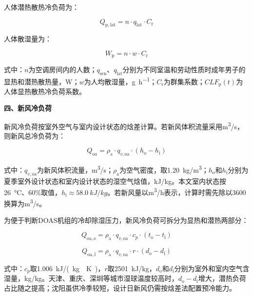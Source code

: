 人体潜热散热冷负荷为：

\begin{equation}
Q_{\mathrm{p,lat}}=n\cdot q_{\mathrm{lat}}\cdot C_{\mathrm{r}}
\label{eq:p-lat}
\end{equation}

人体散湿量为：

\begin{equation}
W_{\mathrm{p}}=n\cdot w\cdot C_{\mathrm{r}}
\label{eq:wet}
\end{equation}

式中：$n$为空调房间内的人数；$q_{\mathrm{sen}}$、$q_{\mathrm{lat}}$分别为不同室温和劳动性质时成年男子的显热和潜热散热量，\si{W}；$w$为人均散湿量，\si{g\per\hour}；$C_{\mathrm{r}}$为群集系数；$CLF_{\mathrm{p}}(t)$为人体显热散热冷负荷系数。

\textbf{四、新风冷负荷}

新风冷负荷按室外空气与室内设计状态的焓差计算。若新风体积流量采用\si{m^3/s}，则新风总冷负荷为：

\begin{equation}
Q_{\mathrm{oa}}=\rho_{\mathrm{a}}\cdot q_{v,\mathrm{oa}}\cdot(h_{\mathrm{o}}-h_{\mathrm{i}})
\label{eq:oa}
\end{equation}

式中：$q_{v,\mathrm{oa}}$为新风体积流量，\si{m^3/s}；$\rho_{\mathrm{a}}$为空气密度，取\SI{1.20}{kg/m^3}；$h_{\mathrm{o}}$和$h_{\mathrm{i}}$分别为夏季室外设计状态和室内设计状态的湿空气焓值，\si{kJ/kg}。本文室内状态按\SI{26}{\degreeCelsius}、60\%取值，$h_{\mathrm{i}}\approx\SI{58.0}{kJ/kg}$。若新风量以\si{m^3/h}表示，计算时需先除以3600换算为\si{m^3/s}。

为便于判断DOAS机组的冷却除湿压力，新风冷负荷可拆分为显热和潜热两部分：

\begin{equation}
Q_{\mathrm{oa,s}}=\rho_{\mathrm{a}}\cdot q_{v,\mathrm{oa}}\cdot c_p\cdot(t_{\mathrm{o}}-t_{\mathrm{i}})
\label{eq:oa-sensible}
\end{equation}

\begin{equation}
Q_{\mathrm{oa,l}}=\rho_{\mathrm{a}}\cdot q_{v,\mathrm{oa}}\cdot r\cdot(d_{\mathrm{o}}-d_{\mathrm{i}})
\label{eq:oa-latent}
\end{equation}

式中：$c_p$取\SI{1.006}{kJ/(kg\cdot K)}，$r$取\SI{2501}{kJ/kg}，$d_{\mathrm{o}}$和$d_{\mathrm{i}}$分别为室外和室内空气含湿量，\si{kg/kg}。天津、重庆、深圳等城市湿球温度较高时，$d_{\mathrm{o}}-d_{\mathrm{i}}$增大，潜热负荷占比随之提高；沈阳虽供冷季较短，设计日新风仍需按焓差法配置预冷能力。

